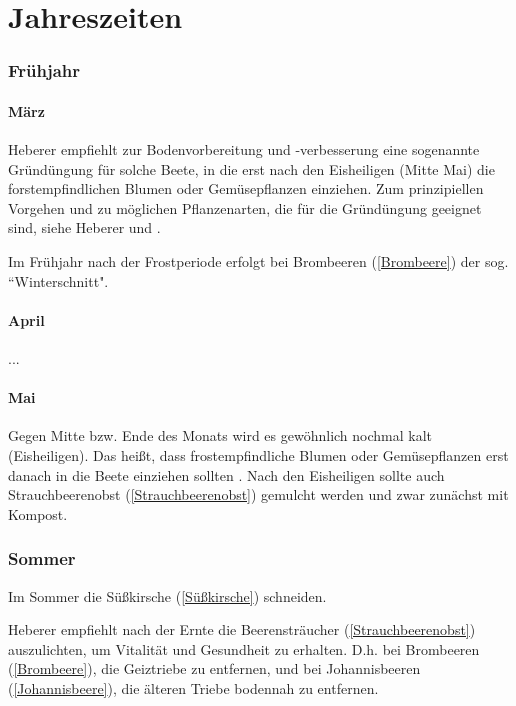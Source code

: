 \part{Jahreszeiten}

\section{Frühjahr}

\subsection{März}
\label{Mai}
Heberer \cite[S.~11]{Heberer2018} empfiehlt zur Bodenvorbereitung und -verbesserung eine sogenannte Gründüngung für solche Beete, in die erst nach den Eisheiligen (Mitte Mai) die forstempfindlichen Blumen oder Gemüsepflanzen einziehen.
Zum prinzipiellen Vorgehen und zu möglichen Pflanzenarten, die für die Gründüngung geeignet sind, siehe Heberer \cite[S.~11]{Heberer2018} und \cite[S.~114f]{Heberer2018}.

Im Frühjahr nach der Frostperiode erfolgt bei Brombeeren (\ref{Brombeere}) der sog. ``Winterschnitt".

\subsection{April}

...

\subsection{Mai}

Gegen Mitte bzw. Ende des Monats wird es gewöhnlich nochmal kalt (Eisheiligen).
Das heißt, dass frostempfindliche Blumen oder Gemüsepflanzen erst danach in die Beete einziehen sollten \cite[S.~11]{Heberer2018}.
Nach den Eisheiligen sollte auch \textrightarrow Strauchbeerenobst (\ref{Strauchbeerenobst}) gemulcht werden und zwar zunächst mit Kompost.

\section{Sommer}

Im Sommer die Süßkirsche (\ref{Süßkirsche}) schneiden.

Heberer \cite[S.~11]{Heberer2018} empfiehlt nach der Ernte die Beerensträucher (\ref{Strauchbeerenobst}) auszulichten, um Vitalität und Gesundheit zu erhalten.
D.h. bei Brombeeren (\ref{Brombeere}), die Geiztriebe zu entfernen, und bei Johannisbeeren (\ref{Johannisbeere}), die älteren Triebe bodennah zu entfernen.

